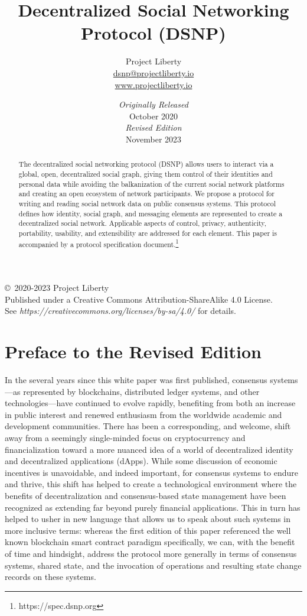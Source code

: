 \documentclass[12pt,letterpaper]{article}
\title{Decentralized Social Networking Protocol (DSNP)}
\author{
	Project Liberty\\
	\href{mailto:dsnp@projectliberty.io}{dsnp@projectliberty.io}\\
	\url{www.projectliberty.io}
}
\date{\textit{Originally Released}\\
October 2020\\
\textit{Revised Edition}\\
November 2023}
\begin{document}
\maketitle

\begin{abstract}
	The decentralized social networking protocol (DSNP) allows users to interact via a global,
	open, decentralized social graph, giving them control of their identities and personal data
	while avoiding the balkanization of the current social network
	platforms and creating an open ecosystem of network participants. We propose a protocol
	for writing and reading social network data on public consensus systems.
	This protocol defines how identity, social graph, and messaging elements are represented
	to create a decentralized social network. Applicable aspects of control, privacy,
	authenticity, portability, usability, and extensibility are addressed for each element.
	This paper is accompanied by a protocol specification document.\footnote{https://spec.dsnp.org}
\end{abstract}

\vfill
\copyright\, 2020-2023 Project Liberty\\
Published under a Creative Commons Attribution-ShareAlike 4.0 License.\\
See \textit{https://creativecommons.org/licenses/by-sa/4.0/} for details.

\thispagestyle{empty}
\clearpage

\raggedright

\section*{Preface to the Revised Edition}

In the several years since this white paper was first published, consensus systems---as
represented by blockchains, distributed ledger systems, and other technologies---have
continued to evolve rapidly, benefiting from both an increase in public interest and renewed
enthusiasm from the worldwide academic and development communities. There has been a
corresponding, and welcome, shift away from a seemingly single-minded focus on
cryptocurrency and financialization toward a more nuanced idea of a world of decentralized
identity and decentralized applications (dApps). While some discussion of economic
incentives is unavoidable, and indeed important, for consensus systems to endure and thrive,
this shift has helped to create a technological environment where the benefits of
decentralization and consensus-based state management have been recognized as extending far
beyond purely financial applications. This in turn has helped to usher in new language that
allows us to speak about such systems in more inclusive terms: whereas the first edition of
this paper referenced the well known blockchain smart contract paradigm specifically, we
can, with the benefit of time and hindsight, address the protocol more generally in terms of
consensus systems, shared state, and the invocation of operations and resulting state change
records on these systems.
\end{document}
